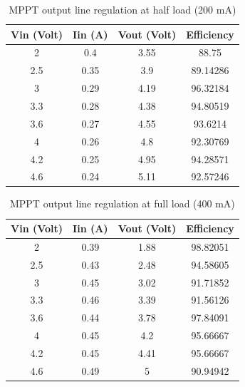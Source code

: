 \begin{table}[!ht]
\centering
\begin{tabular}{c c c c}
\toprule
Vin (Volt) & Iin (A) & Vout (Volt) & Efficiency \\ \midrule\midrule
2          & 0.4     & 3.55        & 88.75      \\ 
2.5        & 0.35    & 3.9         & 89.14286   \\ 
3          & 0.29    & 4.19        & 96.32184   \\ 
3.3        & 0.28    & 4.38        & 94.80519   \\ 
3.6        & 0.27    & 4.55        & 93.6214    \\ 
4          & 0.26    & 4.8         & 92.30769   \\ 
4.2        & 0.25    & 4.95        & 94.28571   \\ 
4.6        & 0.24    & 5.11        & 92.57246   \\ 
\bottomrule
\end{tabular}
\caption{MPPT output line regulation at half load (200 mA)}
\label{table:4}
\end{table}	
\begin{table}[!ht]
	\centering
	\begin{tabular}{c c c c}
		\toprule
		Vin (Volt) & Iin (A) & Vout (Volt) & Efficiency \\ \midrule\midrule
		2          & 0.39    & 1.88        & 98.82051   \\ 
		2.5        & 0.43    & 2.48        & 94.58605   \\ 
		3          & 0.45    & 3.02        & 91.71852   \\ 
		3.3        & 0.46    & 3.39        & 91.56126   \\ 
		3.6        & 0.44    & 3.78        & 97.84091   \\ 
		4          & 0.45    & 4.2         & 95.66667   \\ 
		4.2        & 0.45    & 4.41        & 95.66667   \\ 
		4.6        & 0.49    & 5           & 90.94942   \\ 
		\bottomrule
	\end{tabular}
	\caption{MPPT output line regulation at full load (400 mA)}
	\label{table:4}
\end{table}



